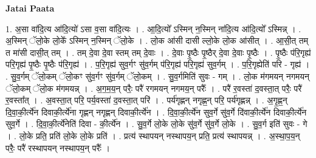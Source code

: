 \documentclass[17pt]{extarticle}
\begin{document}
\textbf{Jatai Paata} \newline

1. अ॒सा वा॑दि॒त्य आ॑दि॒त्यो॑ ऽसा व॒सा वा॑दि॒त्यः । . आ॒दि॒त्यो᳚ ऽस्मिन् न॒स्मिन् ना॑दि॒त्य आ॑दि॒त्यो᳚ ऽस्मिन्न् । . अ॒स्मिन् ॅलो॒के लो॒के᳚ ऽस्मिन् न॒स्मिन् ॅलो॒के । . लो॒क आ॑सी दासी ल्लो॒के लो॒क आ॑सीत् । . आ॒सी॒त् तम् त मा॑सी दासी॒त् तम् । . तम् दे॒वा दे॒वा स्तम् तम् दे॒वाः । . दे॒वाः पृ॒ष्ठैः पृ॒ष्ठैर् दे॒वा दे॒वाः पृ॒ष्ठैः । . पृ॒ष्ठैः प॑रि॒गृह्य॑ परि॒गृह्य॑ पृ॒ष्ठैः पृ॒ष्ठैः प॑रि॒गृह्य॑ । . प॒रि॒गृह्य॑ सुव॒र्गꣳ सु॑व॒र्गम् प॑रि॒गृह्य॑ परि॒गृह्य॑ सुव॒र्गम् । . प॒रि॒गृह्येति॑ परि - गृह्य॑ । . सु॒व॒र्गम् ॅलो॒कम् ॅलो॒कꣳ सु॑व॒र्गꣳ सु॑व॒र्गम् ॅलो॒कम् । . सु॒व॒र्गमिति॑ सुवः - गम् । . लो॒क म॑गमयन् नगमयन् ॅलो॒कम् ॅलो॒क म॑गमयन्न् । . अ॒ग॒म॒य॒न् परैः॒ परै॑ रगमयन् नगमय॒न् परैः᳚ । . परै॑ र॒वस्ता॑ द॒वस्ता॒त् परैः॒ परै॑ र॒वस्ता᳚त् । . अ॒वस्ता॒त् परि॒ पर्य॒वस्ता॑ द॒वस्ता॒त् परि॑ । . पर्य॑गृह्णन् नगृह्ण॒न् परि॒ पर्य॑गृह्णन्न् । . अ॒गृ॒ह्ण॒न् दि॒वा॒की॒र्त्ये॑न दिवाकी॒र्त्ये॑ना गृह्णन् नगृह्णन् दिवाकी॒र्त्ये॑न । . दि॒वा॒की॒र्त्ये॑न सुव॒र्गे सु॑व॒र्गे दि॑वाकी॒र्त्ये॑न दिवाकी॒र्त्ये॑न सुव॒र्गे । . दि॒वा॒की॒र्त्ये॑नेति॑ दिवा - की॒र्त्ये॑न । . सु॒व॒र्गे लो॒के लो॒के सु॑व॒र्गे सु॑व॒र्गे लो॒के । . सु॒व॒र्ग इति॑ सुवः - गे । . लो॒के प्रति॒ प्रति॑ लो॒के लो॒के प्रति॑ । . प्रत्य॑ स्थापयन् नस्थापय॒न् प्रति॒ प्रत्य॑ स्थापयन्न् । . अ॒स्था॒प॒य॒न् परैः॒ परै॑ रस्थापयन् नस्थापय॒न् परैः᳚ । \newline
\end{document}
